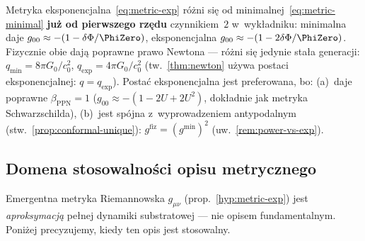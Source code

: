 \begin{remark}\label{rem:metric-relation}
Metryka eksponencjalna~\eqref{eq:metric-exp} r\'o\.zni si\k{e} od
minimalnej~\eqref{eq:metric-minimal} \textbf{ju\.z od pierwszego rz\k{e}du}
czynnikiem~$2$ w~wyk\l{}adniku: minimalna daje
$g_{00} \approx -(1 - \delta\Phi/\PhiZero)$, eksponencjalna
$g_{00} \approx -(1 - 2\delta\Phi/\PhiZero)$.
Fizycznie obie daj\k{a} poprawne prawo Newtona ---
r\'o\.zni si\k{e} jedynie sta\l{}a generacji:
$q_{\mathrm{min}} = 8\pi G_0/c_0^2$,
$q_{\mathrm{exp}} = 4\pi G_0/c_0^2$
(tw.~\ref{thm:newton} u\.zywa postaci eksponencjalnej:
$q = q_{\mathrm{exp}}$).
Posta\'c eksponencjalna jest preferowana, bo:
(a)~daje poprawne $\beta_{\mathrm{PPN}}=1$
($g_{00} \approx -(1 - 2U + 2U^2)$, dok\l{}adnie
jak metryka Schwarzschilda),
(b)~jest sp\'ojna z~wyprowadzeniem antypodalnym
(stw.~\ref{prop:conformal-unique}): $g^{\mathrm{fiz}} = (g^{\mathrm{min}})^2$
(uw.~\ref{rem:power-vs-exp}).
\end{remark}

\subsection{Domena stosowalno\'sci opisu metrycznego}\label{ssec:domena-metryki}

Emergentna metryka Riemannowska $g_{\mu\nu}$ (prop.~\ref{hyp:metric-exp})
jest \emph{aproksymacj\k{a}} pe\l{}nej dynamiki substratowej ---
nie opisem fundamentalnym. Poni\.zej precyzujemy,
kiedy ten opis jest stosowalny.

